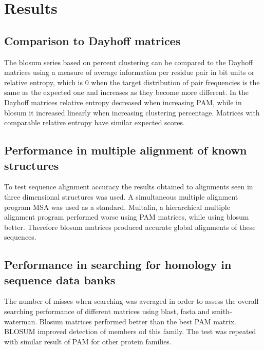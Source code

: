 \section{Results}

	\subsection{Comparison to Dayhoff matrices}
	The blosum series based on percent clustering can be compared to the Dayhoff matrices using a measure of average information per residue pair in bit units or relative entropy, which is $0$ when the target distribution of pair frequencies is the same as the expected one and increases as they become more different.
	In the Dayhoff matrices relative entropy decreased when increasing PAM, while in blosum it increased linearly when increasing clustering percentage.
	Matrices with comparable relative entropy have similar expected scores.

	\subsection{Performance in multiple alignment of known structures}
	To test sequence alignment accuracy the results obtained to alignments seen in three dimensional structures was used.
	A simultaneous multiple alignment program MSA was used as a standard.
	Multalin, a hierarchical multiple alignment program performed worse using PAM matrices, while using blosum better.
	Therefore blosum matrices produced accurate global alignments of these sequences.

	\subsection{Performance in searching for homology in sequence data banks}
	The number of misses when searching was averaged in order to assess the overall searching performance of different matrices using blast, fasta and smith-waterman.
	Blosum matrices performed better than the best PAM matrix.
	BLOSUM improved detection of members od this family.
	The test was repeated with similar result of PAM for other protein families.
